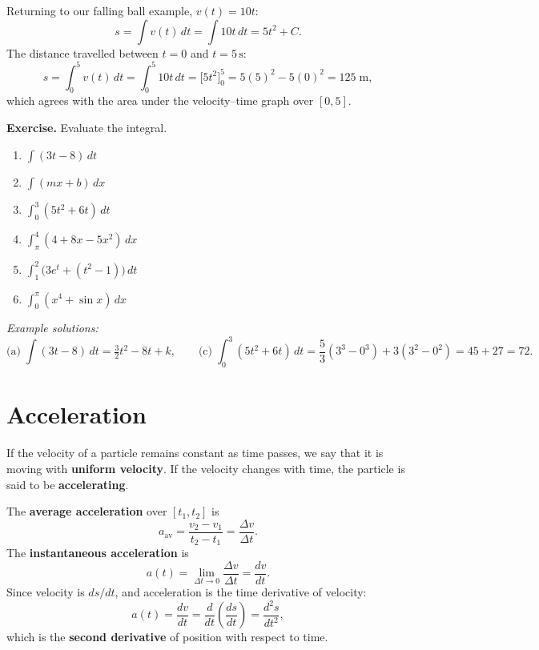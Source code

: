 \medskip
Returning to our falling ball example, $v(t)=10t$:
\[
  s = \int v(t)\,dt = \int 10t\,dt = 5t^2 + C.
\]
The distance travelled between $t=0$ and $t=5\,\text{s}$:
\[
  s = \int_0^5 v(t)\,dt = \int_0^5 10t\,dt = \bigl[5t^2\bigr]_0^5
    = 5(5)^2 - 5(0)^2 = 125\;\text{m},
\]
which agrees with the area under the velocity--time graph over $[0,5]$.

\textbf{Exercise.} Evaluate the integral.
\begin{enumerate}[label=\alph*.]
  \item $\displaystyle\int(3t-8)\,dt$
  \item $\displaystyle\int(mx+b)\,dx$
  \item $\displaystyle\int_0^3(5t^2+6t)\,dt$
  \item $\displaystyle\int_\pi^4(4+8x-5x^2)\,dx$
  \item $\displaystyle\int_1^2\bigl(3e^t+(t^2-1)\bigr)\,dt$
  \item $\displaystyle\int_0^\pi(x^4+\sin x)\,dx$
\end{enumerate}

\textit{Example solutions:}
\[
  \text{(a)}\;\int(3t-8)\,dt = \tfrac{3}{2}t^2 - 8t + k, \qquad
  \text{(c)}\;\int_0^3(5t^2+6t)\,dt = \frac{5}{3}(3^3-0^3)+3(3^2-0^2) = 45+27 = 72.
\]


\section{Acceleration}

If the velocity of a particle remains constant as time passes, we say that it is moving with
\textbf{uniform velocity}. If the velocity changes with time, the particle is said to be
\textbf{accelerating}.

The \textbf{average acceleration} over $[t_1,t_2]$ is
\begin{equation}
  a_\text{av} = \frac{v_2-v_1}{t_2-t_1} = \frac{\Delta v}{\Delta t}.
\end{equation}
The \textbf{instantaneous acceleration} is
\begin{equation}
  a(t) = \lim_{\Delta t\to 0}\frac{\Delta v}{\Delta t} = \frac{dv}{dt}.
\end{equation}
Since velocity is $ds/dt$, and acceleration is the time derivative of velocity:
\begin{equation}
  a(t) = \frac{dv}{dt} = \frac{d}{dt}\!\left(\frac{ds}{dt}\right) = \frac{d^2s}{dt^2},
\end{equation}
which is the \textbf{second derivative} of position with respect to time.

